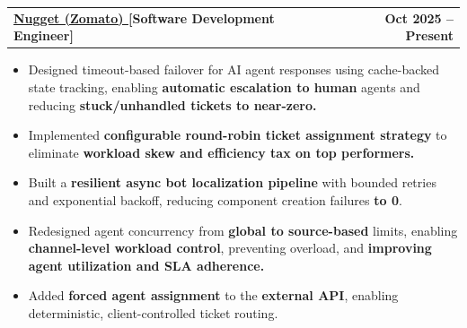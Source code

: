 \documentclass[a4paper,11pt]{article}
\makeatletter
\newcommand{\resumeItem}[1]{
  \item\small{
    {#1 \vspace{-2pt}}
  }
}
\newcommand{\resumeSubheadingg}[2]{
  \vspace{-2pt}\item
    \begin{tabular*}{1.0\textwidth}[t]{l@{\extracolsep{\fill}}r}
      \textbf{#1} & \textbf{\small #2} \\
    \end{tabular*}\vspace{-7pt}
}
\newcommand{\resumeItemListStart}{\begin{itemize}}
\newcommand{\resumeItemListEnd}{\end{itemize}\vspace{-5pt}}
\makeatother
\begin{document}
  \resumeSubheadingg
    {\href{https://www.nugget.com/}{Nugget (Zomato) \scriptsize\faExternalLink*} \hspace{0.5mm} [Software Development Engineer]}{Oct 2025 -- Present}
    \resumeItemListStart
      \resumeItem{Designed timeout-based failover for AI agent responses using cache-backed state tracking, enabling \textbf{automatic escalation to human} agents and reducing \textbf{stuck/unhandled tickets to near-zero.}}
      \resumeItem{Implemented \textbf{configurable round-robin ticket assignment strategy} to eliminate \textbf{workload skew and efficiency tax on top performers.}}
      \resumeItem{Built a \textbf{resilient async bot localization pipeline} with bounded retries and exponential backoff, reducing component creation failures \textbf{to 0}.}
      \resumeItem{Redesigned agent concurrency from \textbf{global to source-based} limits, enabling \textbf{channel-level workload control}, preventing overload, and \textbf{improving agent utilization and SLA adherence.}}
      \resumeItem{Added \textbf{forced agent assignment} to the \textbf{external API}, enabling deterministic, client-controlled ticket routing.}
    \resumeItemListEnd
    \vspace{6pt}
\end{document}
